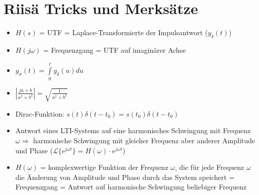 \section{Riisä Tricks und Merksätze}
\begin{itemize}
  \item $H(s)$ = UTF = Laplace-Transformierte der Impulsantwort ($y_\delta(t)$)
  \item $H(j \omega)$ = Frequenzgang = UTF auf imaginärer Achse
  \item $y_\sigma(t) = \int\limits_0^t y_\delta(u)du$
  \item $\left| \frac{ja + b}{a^2 + b^2} \right| = \sqrt{\frac{1}{a^2 + b^2}}$
  \item Dirac-Funktion: $s(t)\delta(t-t_0) = s(t_0)\delta(t-t_0)$
  \item Antwort eines LTI-Systems auf eine harmonisches Schwingung mit Frequenz $\omega \Rightarrow$ harmonische
  Schwingung mit gleicher Frequenz aber anderer Amplitude und Phase ($\mathcal{L}\{e^{j \omega t}\} = H(\omega) \cdot
  e^{j \omega t}$)
  \item $H(\omega)$ = komplexwertige Funktion der Frequenz $\omega$, die für jede Frequenz $\omega$ die
  Änderung von Amplitude und Phase durch das System speichert = Frequenzgang = Antwort auf harmonische Schwingung
  beliebiger Frequenz
\end{itemize}
